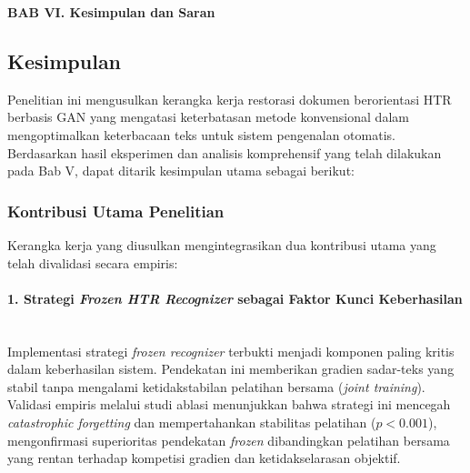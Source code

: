\documentclass[12pt,a4paper]{article}
\begin{document}

\vspace{2cm}
\begin{center}
{\fontsize{14}{16.8}\selectfont\textbf{BAB VI. Kesimpulan dan Saran}}\\[1em]
\end{center}
\label{sec:kesimpulan-dan-saran}
\setcounter{section}{6}
\setcounter{subsection}{0}
\vspace{2em}

\subsection{Kesimpulan}
\label{subsec:kesimpulan}
\vspace{0.8em}

Penelitian ini mengusulkan kerangka kerja restorasi dokumen berorientasi HTR berbasis GAN yang mengatasi keterbatasan metode konvensional dalam mengoptimalkan keterbacaan teks untuk sistem pengenalan otomatis. Berdasarkan hasil eksperimen dan analisis komprehensif yang telah dilakukan pada Bab V, dapat ditarik kesimpulan utama sebagai berikut:

\vspace{0.8em}

\subsubsection{Kontribusi Utama Penelitian}
\label{subsubsec:kontribusi-utama}

Kerangka kerja yang diusulkan mengintegrasikan dua kontribusi utama yang telah divalidasi secara empiris:

\paragraph{1. Strategi \textit{Frozen HTR Recognizer} sebagai Faktor Kunci Keberhasilan} \mbox{}\\[0.1em]
Implementasi strategi \textit{frozen recognizer} terbukti menjadi komponen paling kritis dalam keberhasilan sistem. Pendekatan ini memberikan gradien sadar-teks yang stabil tanpa mengalami ketidakstabilan pelatihan bersama (\textit{joint training}). Validasi empiris melalui studi ablasi menunjukkan bahwa strategi ini mencegah \textit{catastrophic forgetting} dan mempertahankan stabilitas pelatihan ($p<0.001$), mengonfirmasi superioritas pendekatan \textit{frozen} dibandingkan pelatihan bersama yang rentan terhadap kompetisi gradien dan ketidakselarasan objektif.
\end{document}
